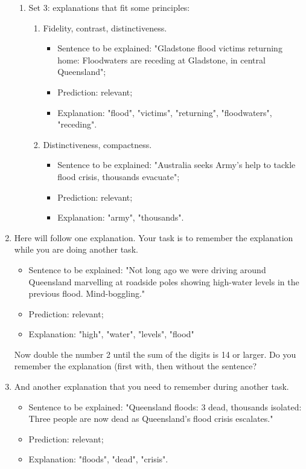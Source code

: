 \begin{enumerate}
\begin{enumerate}
        \item Set 3: explanations that fit some principles: \begin{enumerate}
            \item Fidelity, contrast, distinctiveness. \begin{itemize}
                \item Sentence to be explained: "Gladstone flood victims returning home: Floodwaters are receding at Gladstone, in central Queensland";
                \item Prediction: relevant;
                \item Explanation: "flood", "victims", "returning", "floodwaters", "receding".
            \end{itemize}
            \item Distinctiveness, compactness. \begin{itemize}
                \item Sentence to be explained: "Australia seeks Army's help to tackle flood crisis, thousands evacuate";
                \item Prediction: relevant;
                \item Explanation: "army", "thousands".
            \end{itemize}
        \end{enumerate}
    \end{enumerate}

    \item Here will follow one explanation. Your task is to remember the explanation while you are doing another task. \begin{itemize}
        \item Sentence to be explained: "Not long ago we were driving around Queensland marvelling at roadside poles showing high-water levels in the previous flood. Mind-boggling."
        \item Prediction: relevant;
        \item Explanation: "high", "water", "levels", "flood"
    \end{itemize}
    Now double the number 2 until the sum of the digits is 14 or larger.
    Do you remember the explanation (first with, then without the sentence?
    
    \item And another explanation that you need to remember during another task. \begin{itemize}
        \item Sentence to be explained: "Queensland floods: 3 dead, thousands isolated: Three people are now dead as Queensland’s flood crisis escalates."
        \item Prediction: relevant;
        \item Explanation: "floods", "dead", "crisis".
    \end{itemize}
    

\end{enumerate}
